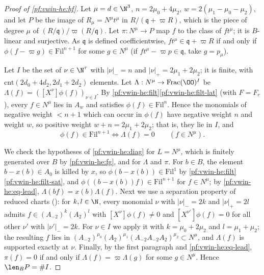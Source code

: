\begin{proof}[Proof of \cref{pf:vwin-he:hf}]
Let $\mu=d\in\N^3$, $n=2\mu_0+4\mu_2$, $w=2(\mu_1-\mu_0-\mu_2)$, and let $P$ be the image of $R_\mu=N^\mu t^\mu$ in
$R/(\mathfrak q+\varpi R)$, which is the piece of degree $\mu$ of $(R/\mathfrak q)/\varpi(R/\mathfrak q)$. Let
$\pi:N^\mu\to P$ map $f$ to the class of $ft^\mu$; it is $B$-linear and surjective. As $\mathfrak q$ is defined
coefficientwise, $ft^\mu\in\mathfrak q+\varpi R$ if and only if $\phi(f-\varpi g)\in\mathrm{Fil}^{n+1}$ for some
$g\in N^\mu$ (if $ft^\mu-\varpi p\in\mathfrak q$, take $g=p_\mu$).

Let $I$ be the set of $\nu\in\N^\tau$ with $|\nu|_-=n$ and $|\nu|_+=2\mu_1+2\mu_2$; it is finite, with
$\mathrm{cnt}(2d_0+4d_2,2d_1+2d_2)$ elements. Let $\Lambda:N^\mu\to\mathrm{Frac}(\OO)^I$ be
$\Lambda(f)=([X^\nu]\phi(f))_{\nu\in I}$. By \cref{pf:vwin-he:filt}\ref{pf:vwin-he:filt-lat} (with $F=F_r$), every
$f\in N^\mu$ lies in $A_w$ and satisfies $\phi(f)\in\mathrm{Fil}^n$. Hence the monomials of negative weight $<n+1$
which can occur in $\phi(f)$ have negative weight $n$ and weight $w$, so positive weight $w+n=2\mu_1+2\mu_2$; that is,
they lie in $I$, and
\begin{equation}\label{pf:vwin-he:eq-lead}
 \phi(f)\in\mathrm{Fil}^{n+1}\iff\Lambda(f)=0\qquad(f\in N^\mu).
\end{equation}

We check the hypotheses of \cref{pf:vwin-he:diag} for $L=N^\mu$, which is finitely generated over $B$ by
\cref{pf:vwin-he:fg}, and for $\Lambda$ and $\pi$. For $b\in B$, the element $b-x(b)\in A_0$ is killed by $x$, so
$\phi(b-x(b))\in\mathrm{Fil}^1$ by \cref{pf:vwin-he:filt}\ref{pf:vwin-he:filt-sat}, and
$\phi((b-x(b))f)\in\mathrm{Fil}^{n+1}$ for $f\in N^\mu$; by \eqref{pf:vwin-he:eq-lead}, $\Lambda(bf)=x(b)\Lambda(f)$.
Next we use a separation property of reduced charts ():
for $k,l\in\N$, every monomial $\nu$ with $|\nu|_-=2k$ and $|\nu|_+=2l$ admits $f\in(A_{-2})^k(A_2)^l$ with
$[X^\nu]\phi(f)\ne0$ and $[X^{\nu'}]\phi(f)=0$ for all other $\nu'$ with $|\nu'|_-=2k$. For $\nu\in I$ we apply it with
$k=\mu_0+2\mu_2$ and $l=\mu_1+\mu_2$; the resulting $f$ lies in
$(A_{-2})^{\mu_0}(A_2)^{\mu_1}(A_{-2}A_{-2}A_2)^{\mu_2}\subset N^\mu$, and $\Lambda(f)$ is supported exactly at $\nu$.
Finally, by the first paragraph and \eqref{pf:vwin-he:eq-lead}, $\pi(f)=0$ if and only if
$\Lambda(f)=\varpi\Lambda(g)$ for some $g\in N^\mu$. Hence $\len_BP=\#I$.
\end{proof}

